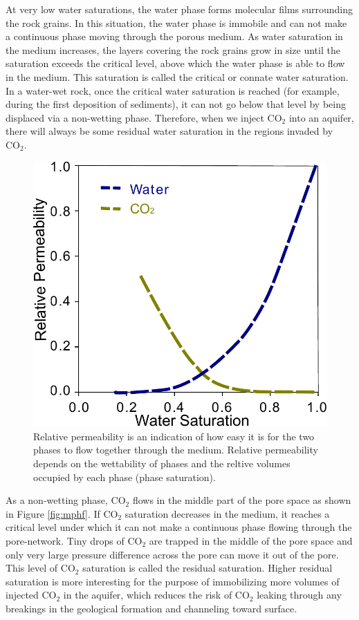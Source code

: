 At very low water saturations, the water phase forms molecular films surrounding the rock grains. In this situation, the water phase is immobile and can not make a continuous phase moving through the porous medium.
As water saturation in the medium increases, the layers covering the rock grains
grow in size until the saturation exceeds the critical level, above which the
water phase is able to flow in the medium. This saturation is called the
critical or connate water saturation. In a water-wet rock, once the
critical water saturation
is reached (for example, during the first deposition of sediments), it can not
go below that level by being displaced via a non-wetting phase. Therefore, when
we inject $\mbox{CO}_2$ into an aquifer, there will always be some residual
water saturation in the regions invaded by $\mbox{CO}_2$.

\begin{figure} 
  \centering{}
  \includegraphics[width= 0.45 \linewidth]{./figurer/Kr}
  \caption{Relative permeability is an indication of how easy it is for the two phases to flow together through the medium. Relative permeability depends on the wettability of phases and the reltive volumes occupied by each phase (phase saturation).}
  \label{fig:kr}
\end{figure}

As a non-wetting phase, $\mbox{CO}_2$ flows in the middle part of the pore space
as shown in Figure \ref{fig:mphf}. If $\mbox{CO}_2$ saturation decreases in the
medium, it reaches a critical level under which it can not make a continuous
phase flowing through the pore-network. Tiny drops of $\mbox{CO}_2$ are trapped
in the middle of the pore space and only very large pressure difference across
the pore can move it out of the pore. This level of $\mbox{CO}_2$ saturation  is
called the residual saturation. Higher residual saturation is more interesting
for the purpose of immobilizing more volumes of injected $\mbox{CO}_2$ in the
aquifer, which reduces the risk of $\mbox{CO}_2$ leaking through any breakings
in the geological formation and channeling toward surface.

